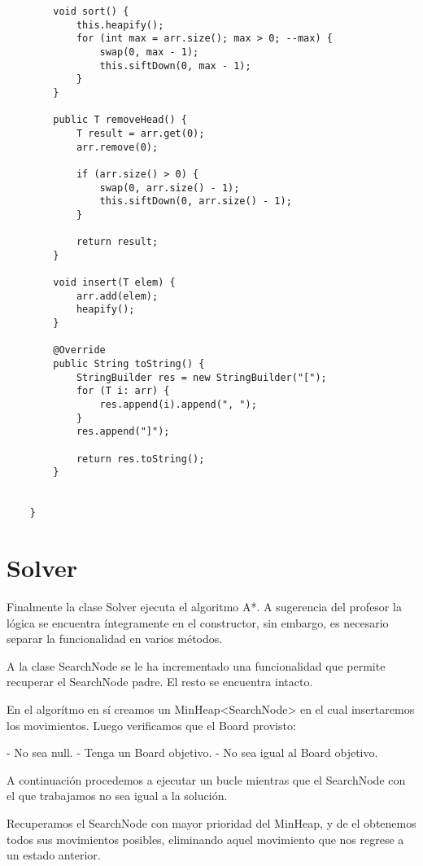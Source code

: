 \documentclass[paper=a4, fontsize=11pt]{scrartcl} %
\numberwithin{equation}{section} %
\numberwithin{figure}{section} %
\numberwithin{table}{section} %
\begin{document}
\begin{lstlisting}
        void sort() {
            this.heapify();
            for (int max = arr.size(); max > 0; --max) {
                swap(0, max - 1);
                this.siftDown(0, max - 1);
            }
        }

        public T removeHead() {
            T result = arr.get(0);
            arr.remove(0);

            if (arr.size() > 0) {
                swap(0, arr.size() - 1);
                this.siftDown(0, arr.size() - 1);
            }

            return result;
        }

        void insert(T elem) {
            arr.add(elem);
            heapify();
        }

        @Override
        public String toString() {
            StringBuilder res = new StringBuilder("[");
            for (T i: arr) {
                res.append(i).append(", ");
            }
            res.append("]");

            return res.toString();
        }


    }

    \end{lstlisting}

    \section{Solver}\label{sec:solver}

    Finalmente la clase Solver ejecuta el algoritmo A*. A sugerencia del profesor la lógica se
    encuentra íntegramente en el constructor, sin embargo, es necesario separar la funcionalidad
    en varios métodos.

    A la clase SearchNode se le ha incrementado una funcionalidad que permite recuperar el SearchNode
    padre.
    El resto se encuentra intacto.

    En el algorítmo en sí creamos un MinHeap<SearchNode> en el cual insertaremos los movimientos.
    Luego verificamos que el Board provisto:

    - No sea null.
    - Tenga un Board objetivo.
    - No sea igual al Board objetivo.

    A continuación procedemos a ejecutar un bucle mientras que el SearchNode con el que trabajamos
    no sea igual a la solución.

    Recuperamos el SearchNode con mayor prioridad del MinHeap, y de el obtenemos todos sus movimientos
    posibles, eliminando aquel movimiento que nos regrese a un estado anterior.
\end{document}
